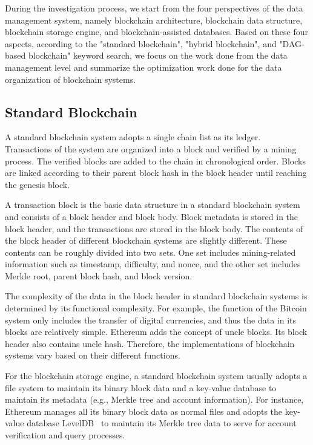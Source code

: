 \documentclass[acmsmall]{acmart}
\begin{document}
During the investigation process, we start from the four perspectives of the data management system, namely blockchain architecture, blockchain data structure, blockchain storage engine, and blockchain-assisted databases. Based on these four aspects, according to the "standard blockchain", "hybrid blockchain", and "DAG-based blockchain" keyword search, we focus on the work done from the data management level and summarize the optimization work done for the data organization of blockchain systems.

\subsection{Standard Blockchain}

A standard blockchain system adopts a single chain list as its ledger. Transactions of the system are organized into a block and verified by a mining process. The verified blocks are added to the chain in chronological order. Blocks are linked according to their parent block hash in the block header until reaching the genesis block. 

A transaction block is the basic data structure in a standard blockchain system and consists of a block header and block body. Block metadata is stored in the block header, and the transactions are stored in the block body. The contents of the block header of different blockchain systems are slightly different. These contents can be roughly divided into two sets. One set includes mining-related information such as timestamp, difficulty, and nonce, and the other set includes Merkle root, parent block hash, and block version. 

The complexity of the data in the block header in standard blockchain systems is determined by its functional complexity. For example, the function of the Bitcoin system only includes the transfer of digital currencies, and thus the data in its blocks are relatively simple. Ethereum adds the concept of uncle blocks. Its block header also contains uncle hash. Therefore, the implementations of blockchain systems vary based on their different functions.

For the blockchain storage engine, a standard blockchain system usually adopts a file system to maintain its binary block data and a key-value database to maintain its metadata (e.g., Merkle tree and account information). For instance, Ethereum manages all its binary block data as normal files and adopts the key-value database LevelDB~\cite{ghemawat2011leveldb} to maintain its Merkle tree data to serve for account verification and query processes. 
\end{document}
